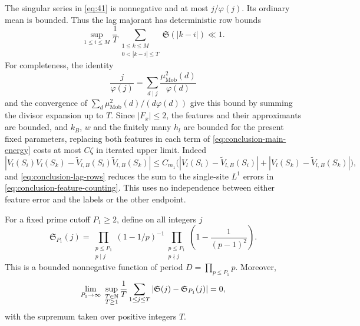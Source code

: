 The singular series in \eqref{eq:41} is nonnegative and at most
$j/\varphi(j)$.  Its ordinary mean is bounded.  Thus the lag majorant
has deterministic row bounds
\begin{equation}
 \sup_{1\le i\le M}
   \frac1T\sum_{\substack{1\le k\le M\\0<|k-i|\le T}}
      \mathfrak S(|k-i|)\ll1.
 \label{eq:conclusion-lag-rows}
\end{equation}
For completeness, the identity
\[
 \frac{j}{\varphi(j)}
   =\sum_{d\mid j}\frac{\mu_{\mathrm{Mob}}^2(d)}{\varphi(d)}
\]
and the convergence of
$\sum_d\mu_{\mathrm{Mob}}^2(d)/(d\varphi(d))$ give this bound by
summing the divisor expansion up to $T$.
Since $|F_x|\le2$, the features and their approximants are bounded,
and $k_B$, $w$ and the finitely many $h_l$ are bounded for the present
fixed parameters, replacing both features in each term of
\eqref{eq:conclusion-main-energy} costs at most $C\zeta$ in iterated
upper limit.  Indeed
\[
 |V_l(S_i)V_l(S_k)
       -\widetilde V_{l,B}(S_i)\widetilde V_{l,B}(S_k)|
 \le C_{m_1}\bigl(
      |V_l(S_i)-\widetilde V_{l,B}(S_i)|
     +|V_l(S_k)-\widetilde V_{l,B}(S_k)|\bigr),
\]
and \eqref{eq:conclusion-lag-rows} reduces the sum to the single-site
$L^1$ errors in \eqref{eq:conclusion-feature-counting}.  This uses no
independence between either feature error and the labels or the other
endpoint.

\begin{lemma}
\label{lem:conclusion-periodic}
For a fixed prime cutoff $P_1\ge2$, define on all integers $j$
\[
 \mathfrak S_{P_1}(j)
 =\prod_{\substack{p\le P_1\\p\mid j}}(1-1/p)^{-1}
   \prod_{\substack{p\le P_1\\p\nmid j}}
       \left(1-\frac1{(p-1)^2}\right).
\]
This is a bounded nonnegative function of period
$D=\prod_{p\le P_1}p$.  Moreover,
\[
 \lim_{P_1\to\infty}\ 
   \sup_{\substack{T\in\N\\T\ge1}}\frac1T
       \sum_{1\le j\le T}
         |\mathfrak S(j)-\mathfrak S_{P_1}(j)|=0,
\]
with the supremum taken over positive integers $T$.
\end{lemma}

